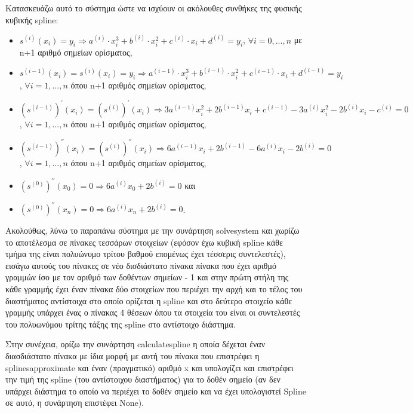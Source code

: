 \documentclass[a4paper,11pt]{article}
\newcommand{\lt}{\latintext}
\begin{document}
Κατασκευάζω αυτό το σύστημα ώστε να ισχύουν οι ακόλουθες συνθήκες της φυσικής κυβικής {\lt spline}:\\
\begin{itemize}    
    \item {\lt $s^{(i)}(x_{i}) = y_{i} \Longrightarrow a^{(i)}\cdot x_{i}^3 + b^{(i)}\cdot x_{i}^2 + c^{(i)}\cdot x_{i} + d^{(i)} = y_i$}, {\lt $\forall i = 0, ..., n$} με {\lt n}+1 αριθμό σημείων ορίσματος,
    \item {\lt $s^{(i-1)}(x_{i}) = s^{(i)}(x_i) =  y_{i} \Longrightarrow a^{(i-1)}\cdot x_{i}^3 + b^{(i-1)}\cdot x_{i}^2 + c^{(i-1)}\cdot x_{i} + d^{(i-1)} = y_i$},  {\lt $\forall i = 1, ..., n$} όπου {\lt n}+1 αριθμός σημείων ορίσματος,
    \item {\lt $(s^{(i-1)})^{'}(x_{i}) = (s^{(i)})^{'}(x_i) \Longrightarrow 3a^{(i-1)}x_{i}^2 + 2b^{(i-1)}x_{i} + c^{(i-1)} - 3a^{(i)}x_i^2 - 2b^{(i)}x_i - c^{(i)} = 0$}, {\lt $\forall i = 1, ..., n$} όπου {\lt n}+1 αριθμός σημείων ορίσματος,
    \item {\lt $(s^{(i-1)})^{''}(x_{i}) = (s^{(i)})^{''}(x_i) \Longrightarrow 6a^{(i-1)}x_{i} + 2b^{(i-1)} - 6a^{(i)}x_i - 2b^{(i)} = 0$}, {\lt $\forall i = 1, ..., n$} όπου {\lt n}+1 αριθμός σημείων ορίσματος,
    \item {\lt $(s^{(0)})^{''}(x_0) = 0 \Longrightarrow  6a^{(i)}x_0 + 2b^{(i)} = 0$} και 
    \item {\lt $(s^{(0)})^{''}(x_n) = 0 \Longrightarrow  6a^{(i)}x_n + 2b^{(i)} = 0$}.
\end{itemize}
Ακολούθως, λύνω το παραπάνω σύστημα με την συνάρτηση {\lt solve\textunderscore system} και χωρίζω το αποτέλεσμα σε πίνακες τεσσάρων στοιχείων (εφόσον έχω κυβική {\lt spline} κάθε τμήμα της είναι πολυώνυμο τρίτου βαθμού επομένως έχει τέσσερις συντελεστές), εισάγω αυτούς του πίνακες σε νέο δισδιάστατο πίνακα πίνακα που έχει αριθμό γραμμών ίσο με τον αριθμό των δοθέντων σημείων - 1 και στην πρώτη στήλη της κάθε γραμμής έχει έναν πίνακα δύο στοιχείων που περιέχει την αρχή και το τέλος του διαστήματος αντίστοιχα στο οποίο ορίζεται η {\lt spline} και στο δεύτερο στοιχείο κάθε γραμμής υπάρχει ένας ο πίνακας 4 θέσεων όπου τα στοιχεία του είναι οι συντελεστές του πολυωνύμου τρίτης τάξης της {\lt spline} στο αντίστοιχο διάστημα.\\

\par
Στην συνέχεια, ορίζω την συνάρτηση {\lt calculate\textunderscore spline} η οποία δέχεται έναν διασδιάστατο πίνακα με ίδια μορφή με αυτή του πίνακα που επιστρέφει η {\lt splines\textunderscore approximate} και έναν (πραγματικό) αριθμό {\lt x} και υπολογίζει και επιστρέφει την τιμή της {\lt spline} (του αντίστοιχου διαστήματος) για το δοθέν σημείο (αν δεν υπάρχει διάστημα το οποίο να περιέχει το δοθέν σημείο και να έχει υπολογιστεί {\lt Spline} σε αυτό, η συνάρτηση επιστέφει {\lt None}).\\
\end{document}
